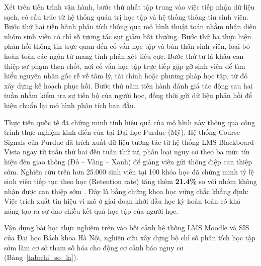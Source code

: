 Xét trên tiến trình vận hành, bước thứ nhất tập trung vào việc tiếp nhận dữ liệu sạch, có cấu trúc từ hệ thống quản trị học tập và hệ thống thông tin sinh viên. Bước thứ hai tiến hành phân tích thông qua mô hình thuật toán nhằm nhận diện nhóm sinh viên có chỉ số tương tác sụt giảm bất thường. Bước thứ ba thực hiện phản hồi thông tin trực quan đến cố vấn học tập và bản thân sinh viên, loại bỏ hoàn toàn các ngôn từ mang tính phán xét tiêu cực. Bước thứ tư là khâu can thiệp sư phạm then chốt, nơi cố vấn học tập trực tiếp gặp gỡ sinh viên để tìm hiểu nguyên nhân gốc rễ về tâm lý, tài chính hoặc phương pháp học tập, từ đó xây dựng kế hoạch phục hồi. Bước thứ năm tiến hành đánh giá tác động sau hai tuần nhằm kiểm tra sự tiến bộ của người học, đồng thời gửi dữ liệu phản hồi để hiệu chuẩn lại mô hình phân tích ban đầu.

Thực tiễn quốc tế đã chứng minh tính hiệu quả của mô hình này thông qua công trình thực nghiệm kinh điển của \citet{arnold2012} tại Đại học Purdue (Mỹ). Hệ thống Course Signals của Purdue đã trích xuất dữ liệu tương tác từ hệ thống LMS Blackboard Vista ngay từ tuần thứ hai đến tuần thứ tư, phân loại nguy cơ theo ba mức tín hiệu đèn giao thông (Đỏ -- Vàng -- Xanh) để giảng viên gửi thông điệp can thiệp sớm. Nghiên cứu trên hơn 25.000 sinh viên tại 100 khóa học đã chứng minh tỷ lệ sinh viên tiếp tục theo học (Retention rate) tăng thêm \textbf{21.4\%} so với nhóm không nhận được can thiệp sớm \citep{arnold2012}. Đây là bằng chứng khoa học vững chắc khẳng định: Việc trích xuất tín hiệu vi mô ở giai đoạn khởi đầu học kỳ hoàn toàn có khả năng tạo ra sự đảo chiều kết quả học tập của người học.

Vận dụng bài học thực nghiệm trên vào bối cảnh hệ thống LMS Moodle và SIS của Đại học Bách khoa Hà Nội, nghiên cứu xây dựng bộ chỉ số phân tích học tập sớm làm cơ sở tham số hóa cho động cơ cảnh báo nguy cơ (Bảng~\ref{tab:chi_so_la}).

